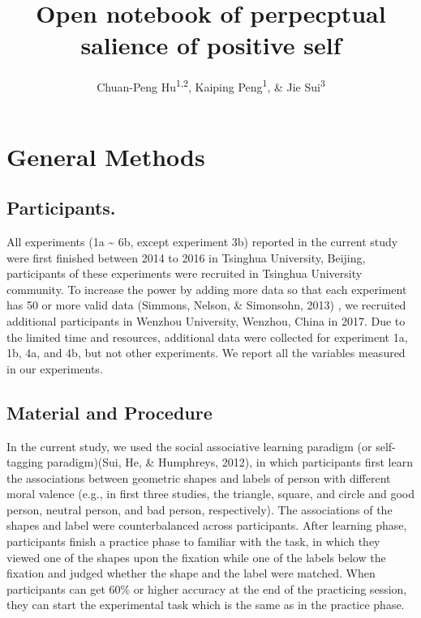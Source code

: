 \documentclass[man]{apa6}
\title{Open notebook of perpecptual salience of positive self}
\author{Chuan-Peng Hu\textsuperscript{1,2}, Kaiping Peng\textsuperscript{1}, \& Jie Sui\textsuperscript{3}}
\date{}
\affiliation{
\vspace{0.5cm}
\textsuperscript{1} Tsinghua University, 100084 Beijing, China\\\textsuperscript{2} German Resilience Center, 55131 Mainz, Germany\\\textsuperscript{3} University of Bath, Bath, UK}
\begin{document}
\maketitle

\hypertarget{general-methods}{%
\section{General Methods}\label{general-methods}}

\hypertarget{participants.}{%
\subsection{Participants.}\label{participants.}}

All experiments (1a \textasciitilde{} 6b, except experiment 3b) reported in the current study were first finished between 2014 to 2016 in Tsinghua University, Beijing, participants of these experiments were recruited in Tsinghua University community. To increase the power by adding more data so that each experiment has 50 or more valid data (Simmons, Nelson, \& Simonsohn, 2013) , we recruited additional participants in Wenzhou University, Wenzhou, China in 2017. Due to the limited time and resources, additional data were collected for experiment 1a, 1b, 4a, and 4b, but not other experiments. We report all the variables measured in our experiments.

\hypertarget{material-and-procedure}{%
\subsection{Material and Procedure}\label{material-and-procedure}}

In the current study, we used the social associative learning paradigm (or self-tagging paradigm)(Sui, He, \& Humphreys, 2012), in which participants first learn the associations between geometric shapes and labels of person with different moral valence (e.g., in first three studies, the triangle, square, and circle and good person, neutral person, and bad person, respectively). The associations of the shapes and label were counterbalanced across participants. After learning phase, participants finish a practice phase to familiar with the task, in which they viewed one of the shapes upon the fixation while one of the labels below the fixation and judged whether the shape and the label were matched. When participants can get 60\% or higher accuracy at the end of the practicing session, they can start the experimental task which is the same as in the practice phase.
\end{document}
